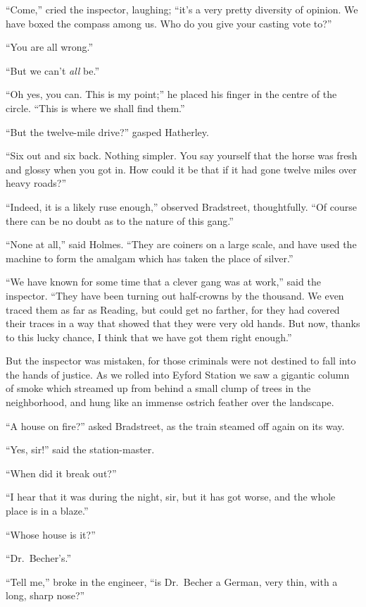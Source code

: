 “Come,” cried the inspector, laughing; “it’s a very pretty
diversity of opinion. We have boxed the compass among us.
Who do you give your casting vote to?”

“You are all wrong.”

“But we can’t \textit{all} be.”

“Oh yes, you can. This is my point;” he placed his finger
in the centre of the circle. “This is where we shall find
them.”

“But the twelve-mile drive?” gasped Hatherley.

“Six out and six back. Nothing simpler. You say yourself
that the horse was fresh and glossy when you got in.
How could it be that if it had gone twelve miles over heavy
roads?”

“Indeed, it is a likely ruse enough,” observed Bradstreet,
thoughtfully. “Of course there can be no doubt as to the
nature of this gang.”

“None at all,” said Holmes. “They are coiners on a large
scale, and have used the machine to form the amalgam which
has taken the place of silver.”

“We have known for some time that a clever gang was at
work,” said the inspector. “They have been turning out
half-crowns by the thousand. We even traced them as far as
Reading, but could get no farther, for they had covered their
traces in a way that showed that they were very old hands.
But now, thanks to this lucky chance, I think that we have
got them right enough.”

But the inspector was mistaken, for those criminals were
not destined to fall into the hands of justice. As we rolled
into Eyford Station we saw a gigantic column of smoke which
streamed up from behind a small clump of trees in the neighborhood,
and hung like an immense ostrich feather over the
landscape.

“A house on fire?” asked Bradstreet, as the train steamed
off again on its way.

“Yes, sir!” said the station-master.

“When did it break out?”

“I hear that it was during the night, sir, but it has got
worse, and the whole place is in a blaze.”

“Whose house is it?”

“Dr.\ Becher’s.”

“Tell me,” broke in the engineer, “is Dr.\ Becher a German,
very thin, with a long, sharp nose?”

